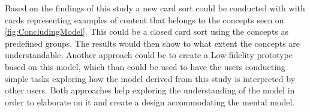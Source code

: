 Based on the findings of this study a new card sort could be conducted with with cards representing examples of content that belongs to the concepts seen on \autoref{fig:ConcludingModel}. This could be a closed card sort using the concepts as predefined groups. The results would then show to what extent the concepts are understandable. Another approach could be to create a Low-fidelity prototype based on this model, which than could be used to have the users conducting simple tasks exploring how the model derived from this study is interpreted by other users. Both approaches help exploring the understanding of the model in order to elaborate on it and create a design accommodating the mental model. 


